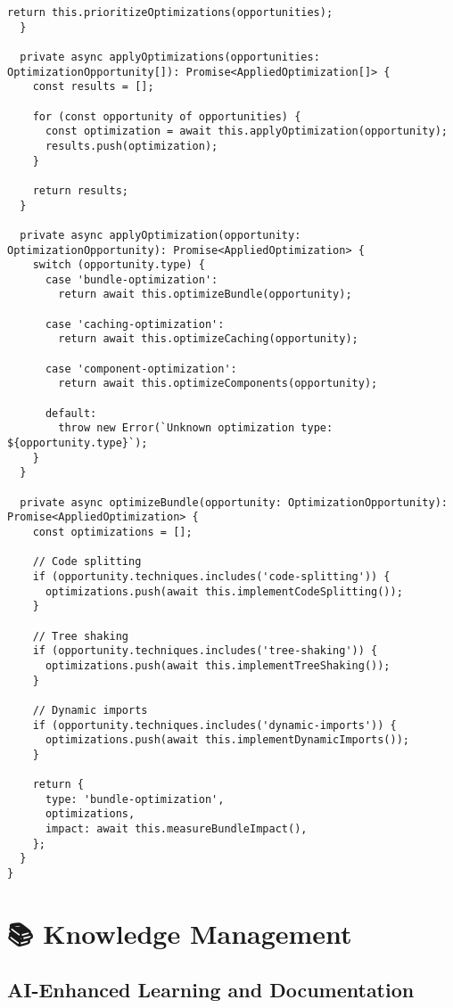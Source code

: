 \documentclass[11pt,a4paper]{article}
\begin{document}
\begin{lstlisting}[style=typescript, caption=AI-Powered Performance Optimization]
    return this.prioritizeOptimizations(opportunities);
  }

  private async applyOptimizations(opportunities: OptimizationOpportunity[]): Promise<AppliedOptimization[]> {
    const results = [];

    for (const opportunity of opportunities) {
      const optimization = await this.applyOptimization(opportunity);
      results.push(optimization);
    }

    return results;
  }

  private async applyOptimization(opportunity: OptimizationOpportunity): Promise<AppliedOptimization> {
    switch (opportunity.type) {
      case 'bundle-optimization':
        return await this.optimizeBundle(opportunity);
      
      case 'caching-optimization':
        return await this.optimizeCaching(opportunity);
      
      case 'component-optimization':
        return await this.optimizeComponents(opportunity);
      
      default:
        throw new Error(`Unknown optimization type: ${opportunity.type}`);
    }
  }

  private async optimizeBundle(opportunity: OptimizationOpportunity): Promise<AppliedOptimization> {
    const optimizations = [];

    // Code splitting
    if (opportunity.techniques.includes('code-splitting')) {
      optimizations.push(await this.implementCodeSplitting());
    }

    // Tree shaking
    if (opportunity.techniques.includes('tree-shaking')) {
      optimizations.push(await this.implementTreeShaking());
    }

    // Dynamic imports
    if (opportunity.techniques.includes('dynamic-imports')) {
      optimizations.push(await this.implementDynamicImports());
    }

    return {
      type: 'bundle-optimization',
      optimizations,
      impact: await this.measureBundleImpact(),
    };
  }
}
\end{lstlisting}

\section{📚 Knowledge Management}

\subsection{AI-Enhanced Learning and Documentation}
\end{document}
